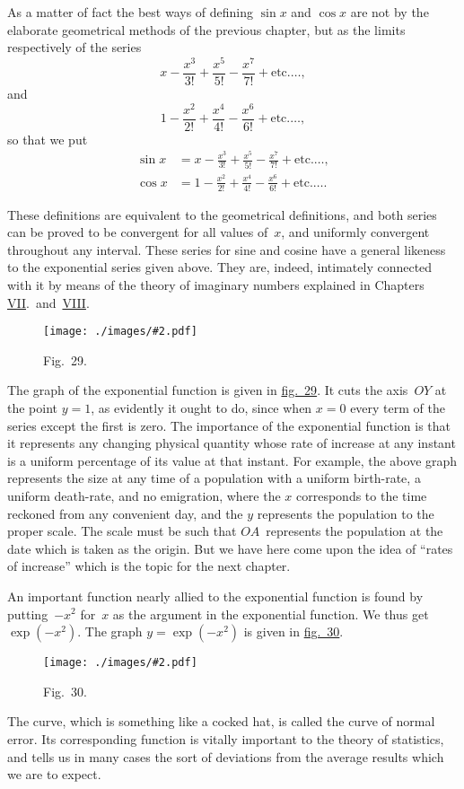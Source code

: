 \documentclass[12pt,leqno]{book}[2005/09/16]
\newcommand{\Typo}[2]{#2}
\newcommand{\Graphic}[2]{%
  \phantomsection\label{fig:#2}%
  \texttt{[image: ./images/\#2.pdf]}%
}
\newcommand{\DefWidth}{4in}%
\newcommand{\Figure}[2][\DefWidth]{%
  \begin{figure}[hbt!]
    \centering
    \phantomsection\label{fig:#2}
    \Graphic{#1}{fig#2}
    \caption{Fig.~#2.}
  \end{figure}\ignorespaces%
}
\newcommand{\Fig}[2][Fig.]{\hyperref[fig:#2]{#1~#2}}
\newcommand{\ChapNum}[1]{\hyperref[chapter:#1]{#1}}
\newcommand{\PageSep}[1]{\ignorespaces}
\begin{document}
As a matter of fact the best ways of defining
$\sin x$ and $\cos x$ are not by the elaborate
geometrical methods of the previous chapter,
but as the limits respectively of the series
\[
x - \frac{x^{3}}{3!} + \frac{x^{5}}{5!} - \frac{x^{7}}{7!} + \text{etc.} \dots,
\]
and
\[
1 - \frac{x^{2}}{2!} + \frac{x^{4}}{4!} - \frac{x^{6}}{6!} + \text{etc.} \dots,
\]
so that we put
\begin{align*}
\sin x &= x - \frac{x^{3}}{3!} + \frac{x^{5}}{5!} - \frac{x^{7}}{7!} + \text{etc.} \dots, \\
\cos x &= 1 - \frac{x^{2}}{2!} + \frac{x^{4}}{4!} - \frac{x^{6}}{6!} + \text{etc.} \dots\Typo{,}{.}
\end{align*}
\PageSep{213}

These definitions are equivalent to the geometrical
definitions, and both series can be
proved to be convergent for all values of~$x$,
and uniformly convergent throughout any
interval. These series for sine and cosine
have a general likeness to the exponential
series given above. They are, indeed, intimately
connected with it by means of the
theory of imaginary numbers explained in
Chapters \ChapNum{VII}.\ and~\ChapNum{VIII}.
\Figure{29}

The graph of the exponential function is
given in \Fig[fig.]{29}. It cuts the axis~$OY$ at the
point $y = 1$, as evidently it ought to do, since
when $x = 0$ every term of the series except
the first is zero. The importance of the exponential
function is that it represents any
changing physical quantity whose rate of
increase at any instant is a uniform percentage
of its value at that instant. For
\PageSep{214}
example, the above graph represents the size
at any time of a population with a uniform
birth-rate, a uniform death-rate, and no emigration,
where the $x$ corresponds to the time
reckoned from any convenient day, and the
$y$ represents the population to the proper
scale. The scale must be such that $OA$~represents
the population at the date which is
taken as the origin. But we have here come
upon the idea of ``rates of increase'' which
is the topic for the next chapter.

An important function nearly allied to the
%
exponential function is found by putting~$-x^{2}$
for~$x$ as the argument in the exponential function.
We thus get $\exp (-x^{2})$. The graph
$y = \exp(-x^{2})$ is given in \Fig[fig.]{30}.
\Figure{30}

The curve, which is something like a cocked
hat, is called the curve of normal error. Its
\PageSep{215}
corresponding function is vitally important
to the theory of statistics, and tells us in
many cases the sort of deviations from the
average results which we are to expect.
\end{document}
